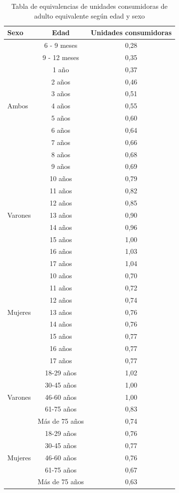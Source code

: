 \begin{table}[!htbp]
	\centering
	\caption{Tabla de equivalencias de unidades consumidoras de adulto equivalente según edad y sexo}
	\label{tab:tableAE2004}
	\begin{tabular}{l|c|c}
		Sexo & Edad & Unidades consumidoras\\
		\hline
		\hline
		{} & 6 - 9 meses & 0,28 \\
		{} & 9 - 12 meses & 0,35 \\
		{} & 1 año & 0,37 \\
		{} & 2 años & 0,46 \\
		{} & 3 años & 0,51 \\
		Ambos & 4 años & 0,55 \\
		{} & 5 años & 0,60 \\
		{} & 6 años & 0,64 \\
		{} & 7 años & 0,66 \\
		{} & 8 años & 0,68 \\
		{} & 9 años & 0,69 \\
		\hline
		{} & 10 años & 0,79 \\
		{} & 11 años & 0,82 \\
		{} & 12 años & 0,85 \\
		Varones & 13 años & 0,90 \\
		{} & 14 años & 0,96 \\
		{} & 15 años & 1,00 \\
		{} & 16 años & 1,03 \\
		{} & 17 años & 1,04 \\
		\hline
		{} & 10 años & 0,70 \\
		{} & 11 años & 0,72 \\
		{} & 12 años & 0,74 \\
		Mujeres & 13 años & 0,76 \\
		{} & 14 años & 0,76 \\
		{} & 15 años & 0,77 \\
		{} & 16 años & 0,77 \\
		{} & 17 años & 0,77 \\
		\hline
		{} & 18-29 años & 1,02 \\
		{} & 30-45 años & 1,00 \\
		Varones & 46-60 años & 1,00 \\
		{} & 61-75 años & 0,83 \\
		{} & Más de 75 años & 0,74 \\
		\hline
		{} & 18-29 años & 0,76 \\
		{} & 30-45 años & 0,77 \\
		Mujeres & 46-60 años & 0,76 \\
		{} & 61-75 años & 0,67 \\
		{} & Más de 75 años & 0,63 \\
	\end{tabular}
\end{table}



